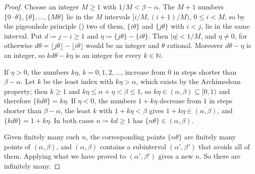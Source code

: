\begin{proof}
Choose an integer $M\ge1$ with $1/M<\beta-\alpha$. The $M+1$ numbers $\{0\cdot\theta\},\{\theta\},\ldots,\{M\theta\}$ lie in the $M$ intervals $[i/M,(i+1)/M)$, $0\le i<M$, so by the pigeonhole principle () two of them, $\{i\theta\}$ and $\{j\theta\}$ with $i<j$, lie in the same interval. Put $d\coloneqq j-i\ge1$ and $\eta\coloneqq\{j\theta\}-\{i\theta\}$. Then $|\eta|<1/M$, and $\eta\ne0$, for otherwise $d\theta=\lfloor j\theta\rfloor-\lfloor i\theta\rfloor$ would be an integer and $\theta$ rational. Moreover $d\theta-\eta$ is an integer, so $kd\theta-k\eta$ is an integer for every $k\in\mathbb N$.

If $\eta>0$, the numbers $k\eta$, $k=0,1,2,\ldots$, increase from $0$ in steps shorter than $\beta-\alpha$. Let $k$ be the least index with $k\eta>\alpha$, which exists by the Archimedean property; then $k\ge1$ and $k\eta\le\alpha+\eta<\beta\le1$, so $k\eta\in(\alpha,\beta)\subseteq[0,1)$ and therefore $\{kd\theta\}=k\eta$. If $\eta<0$, the numbers $1+k\eta$ decrease from $1$ in steps shorter than $\beta-\alpha$, the least $k$ with $1+k\eta<\beta$ gives $1+k\eta\in(\alpha,\beta)$, and $\{kd\theta\}=1+k\eta$. In both cases $n\coloneqq kd\ge1$ has $\{n\theta\}\in(\alpha,\beta)$.

Given finitely many such $n$, the corresponding points $\{n\theta\}$ are finitely many points of $(\alpha,\beta)$, and $(\alpha,\beta)$ contains a subinterval $(\alpha',\beta')$ that avoids all of them. Applying what we have proved to $(\alpha',\beta')$ gives a new $n$. So there are infinitely many.
\end{proof}


